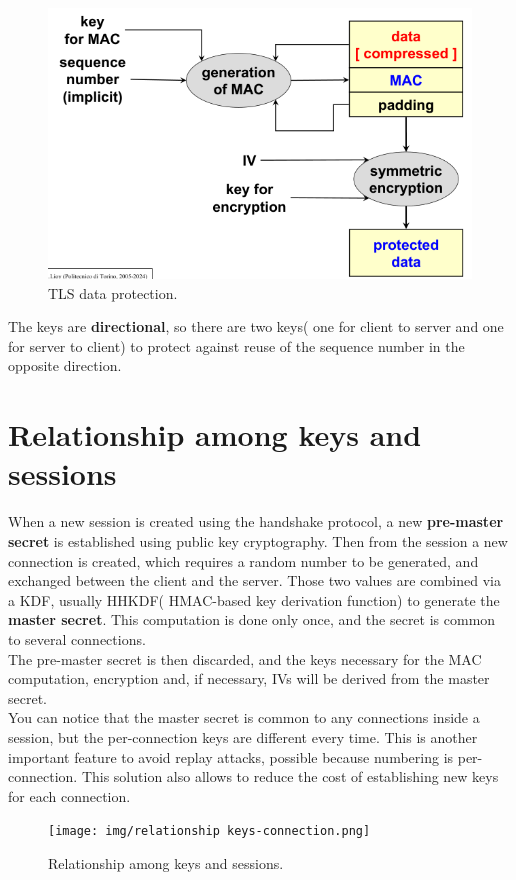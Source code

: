 \begin{figure}[H]
  \centering
  \includegraphics[width=.5\textwidth]{img/TLS data protection.png}
  \caption{TLS data protection.}
  \label{fig:tls-data-protection}
\end{figure}

The keys are \textbf{directional}, so there are two keys( one for
client to server and one for server to client) to protect against
reuse of the sequence number in the opposite direction.

\section{Relationship among keys and sessions}
When a new session is created using the handshake protocol, a new
\textbf{pre-master secret} is established using public key
cryptography. Then from the session a new connection is created, which
requires a random number to be generated, and exchanged between the
client and the server. Those two values are combined via a KDF,
usually HHKDF( HMAC-based key derivation function) to generate the 
\textbf{master secret}. This computation is done only once, and the 
secret is common to several connections.\\
The pre-master secret is then discarded, and the keys necessary for
the MAC computation, encryption and, if necessary, IVs will be derived
from the master secret.\\
You can notice that the master secret is common to any connections
inside a session, but the per-connection keys are different every
time. This is another important feature to avoid replay attacks,
possible because numbering is per-connection. This solution also
allows to reduce the cost of establishing new keys for each
connection.

\begin{figure}[H]
  \centering
  \texttt{[image: img/relationship
  keys-connection.png]}
  \caption{Relationship among keys and sessions.}
  \label{fig:tls-keys-and-sessions}
\end{figure}

